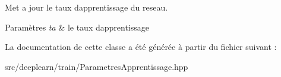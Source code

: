 Met a jour le taux d\textquotesingle{}apprentissage du reseau. 


\begin{DoxyParams}{Paramètres}
{\em ta} & le taux d\textquotesingle{}apprentissage \\
\hline
\end{DoxyParams}


La documentation de cette classe a été générée à partir du fichier suivant \+:\begin{DoxyCompactItemize}
\item 
src/deeplearn/train/Parametres\+Apprentissage.\+hpp\end{DoxyCompactItemize}
